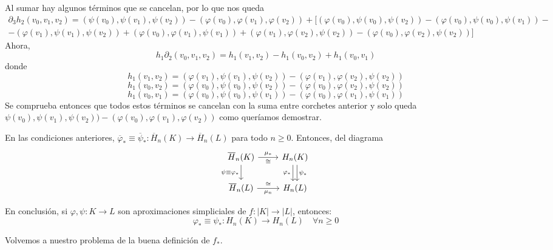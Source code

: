 \documentclass[HS.tex]{subfiles}
\begin{document}
\begin{dem}
\[\]
Al sumar hay algunos términos que se cancelan, por lo que nos queda
\begin{gather*}
\partial_3h_2(v_0,v_1,v_2)=(\psi(v_0),\psi(v_1),\psi(v_2))-(\varphi(v_0), \varphi(v_1),\varphi(v_2))+ [(\varphi(v_0), \psi(v_0),\psi(v_2))-(\varphi(v_0), \psi(v_0),\psi(v_1))-\\
-(\varphi(v_1),\psi(v_1),\psi(v_2))+(\varphi(v_0), \varphi(v_1),\psi(v_1))+( \varphi(v_1),\varphi(v_2),\psi(v_2))-(\varphi(v_0), \varphi(v_2),\psi(v_2))]
\end{gather*}
Ahora,
\[
h_1\partial_2(v_0,v_1,v_2)=h_1(v_1,v_2)-h_1(v_0,v_2)+h_1(v_0,v_1)
\]
donde
\[
h_1(v_1,v_2)=(\varphi(v_1),\psi(v_1),\psi(v_2))-(\varphi(v_1),\varphi(v_2),\psi(v_2))
\]
\[
h_1(v_0,v_2)=(\varphi(v_0),\psi(v_0),\psi(v_2))-(\varphi(v_0),\varphi(v_2),\psi(v_2))
\]
\[
h_1(v_0,v_1)=(\varphi(v_0),\psi(v_0),\psi(v_1))-(\varphi(v_0),\varphi(v_1),\psi(v_1))
\]
Se comprueba entonces que todos estos términos se cancelan con la suma entre corchetes anterior y solo queda $\psi(v_0),\psi(v_1),\psi(v_2))-(\varphi(v_0), \varphi(v_1),\varphi(v_2))$ como queríamos demostrar. \QED
\end{dem}

\begin{coro}
En las condiciones anteriores, $\overline{\varphi}_* \equiv \overline{\psi}_* \colon \overline{H}_n(K) \to \overline{H}_n(L)$ para todo $n \geq 0$.
Entonces, del diagrama
\[\begin{tikzcd}{\overline{H}_n(K)} \arrow[r,"\mu_*","\cong" below] \arrow[d,"\psi\equiv\varphi_*" left] & {H_n(K)} \arrow[d,shift right,"\varphi_*" left] \arrow[d,shift left,"\psi_*" right]\\
{\overline{H}_n(L)} \arrow[r,"\mu_n" below,"\cong" above] & H_n(L)
\end{tikzcd}\]

En conclusión, si $\varphi, \psi \colon K \to L$ son aproximaciones simpliciales de $f \colon |K| \to |L|$, entonces:
\[ \varphi_{*} \equiv \psi_* \colon H_n(K) \to H_n(L) \quad \forall n \geq 0\]
\end{coro}

Volvemos a nuestro problema de la buena definición de $f_*$.
\end{document}
